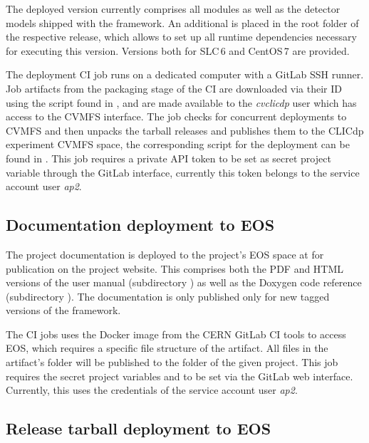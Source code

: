 The deployed version currently comprises all modules as well as the detector models shipped with the framework.
An additional  is placed in the root folder of the respective release, which allows to set up all runtime dependencies necessary for executing this version.
Versions both for SLC\,6 and CentOS\,7 are provided.

The deployment CI job runs on a dedicated computer with a GitLab SSH runner.
Job artifacts from the packaging stage of the CI are downloaded via their ID using the script found in , and are made available to the \emph{cvclicdp} user which has access to the CVMFS interface.
The job checks for concurrent deployments to CVMFS and then unpacks the tarball releases and publishes them to the CLICdp experiment CVMFS space, the corresponding script for the deployment can be found in .
This job requires a private API token to be set as secret project variable through the GitLab interface, currently this token belongs to the service account user \emph{ap2}.

\subsection{Documentation deployment to EOS}

The project documentation is deployed to the project's EOS space at  for publication on the project website.
This comprises both the PDF and HTML versions of the user manual (subdirectory ) as well as the Doxygen code reference (subdirectory ).
The documentation is only published only for new tagged versions of the framework.

The CI jobs uses the  Docker image from the CERN GitLab CI tools to access EOS, which requires a specific file structure of the artifact.
All files in the artifact's  folder will be published to the  folder of the given project.
This job requires the secret project variables  and  to be set via the GitLab web interface.
Currently, this uses the credentials of the service account user \emph{ap2}.

\subsection{Release tarball deployment to EOS}

